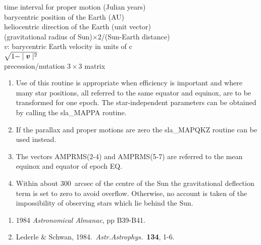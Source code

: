 {
  \\
  \\
  \\
  \\
  \\
      {time interval for proper motion (Julian years)} \\
    {barycentric position of the Earth (AU)} \\
    {heliocentric direction of the Earth (unit vector)} \\
      {(gravitational radius of
                      Sun)$\times 2 / $(Sun-Earth distance)} \\
   {\mbox{\boldmath $v$}: barycentric Earth
                                               velocity in units of c} \\
     {$\sqrt{1-\mid\mbox{\boldmath $v$}\mid^2}$} \\
  {precession/nutation $3\times3$ matrix}
}
{
}
\notes
{
 \begin{enumerate}
  \item Use of this routine is appropriate when efficiency is important
        and where many star positions, all referred to the same equator
        and equinox, are to be transformed for one epoch.  The
        star-independent parameters can be obtained by calling the
        sla\_MAPPA routine.
  \item If the parallax and proper motions are zero the sla\_MAPQKZ
        routine can be used instead.
  \item The vectors AMPRMS(2-4) and AMPRMS(5-7) are referred to
        the mean equinox and equator of epoch EQ.
  \item Within about 300~arcsec of the centre of the Sun the
        gravitational deflection term is set to zero to avoid
        overflow.  Otherwise, no account is taken of the
        impossibility of observing stars which lie behind
        the Sun.
 \end{enumerate}
}
{
 \begin{enumerate}
  \item 1984 {\it Astronomical Almanac}, pp B39-B41.
  \item Lederle \& Schwan, 1984.\ {\it Astr.Astrophys.}\ {\bf 134}, 1-6.
 \end{enumerate}
}
